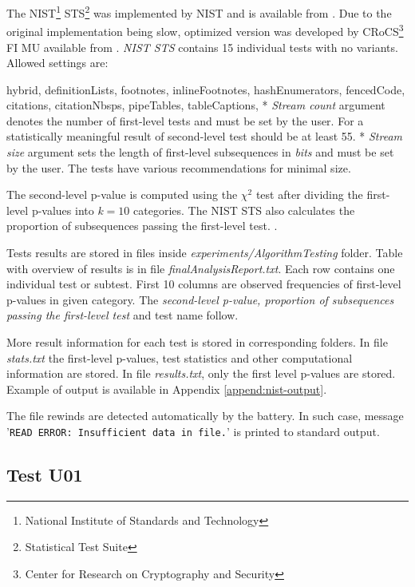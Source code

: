 \documentclass[
  digital,     %
  oneside,     %
  nosansbold,  %
  nocolorbold, %
  nolof,         %
  nolot,         %
]{fithesis4}
\begin{document}
The NIST\footnote{National Institute of Standards and Technology} STS\footnote{Statistical Test Suite} was implemented by NIST \cite{nist_special} and is available from \cite{nist_site}. Due to the original implementation being slow, optimized version was developed by CRoCS\footnote{Center for Research on Cryptography and Security} FI MU \cite{nist_faster} available from \cite{nist-opt}. \emph{NIST STS} contains 15 individual tests with no variants. Allowed settings are:
\begin{markdown*}{%
  hybrid,
  definitionLists,
  footnotes,
  inlineFootnotes,
  hashEnumerators,
  fencedCode,
  citations,
  citationNbsps,
  pipeTables,
  tableCaptions,
}
* \emph{Stream count} argument denotes the number of first-level tests and must be set by the user. For a statistically meaningful result of second-level test should be at least 55. 
* \emph{Stream size} argument sets the length of first-level subsequences in \emph{bits} and must be set by the user. The tests have various recommendations for minimal size.
\end{markdown*}

The second-level p-value is computed using the $\chi^2$ test after dividing the first-level p-values into $k=10$ categories. The NIST STS also calculates the proportion of subsequences passing the first-level test. \cite[p. 4-1]{nist_special}.

Tests results are stored in files inside \emph{experiments/AlgorithmTesting} folder. Table with overview of results is in file \emph{finalAnalysisReport.txt}. Each row contains one individual test or subtest. First 10 columns are observed frequencies of first-level p-values in given category. The \emph{second-level p-value, proportion of subsequences passing the first-level test} and test name follow. 

More result information for each test is stored in corresponding folders. In file \emph{stats.txt} the first-level p-values, test statistics and other computational information are stored. In file \emph{results.txt}, only the first level p-values are stored. Example of output is available in Appendix \ref{append:nist-output}.

The file rewinds are detected automatically by the battery. In such case, message '\texttt{READ ERROR:  Insufficient data in file.}' is printed to standard output.


\subsection{Test U01} \label{chap:sols-testu01}
\end{document}
